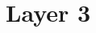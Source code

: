 \documentclass[a4paper]{article}
\theoremstyle{definition}
\newtheorem{definition}{Definition}[section]
\newtheorem{proposition}[definition]{Proposition}
\theoremstyle{remark}
\newcommand{\defn}{\emph}
\renewcommand{\phi}{\varphi}
\newcommand{\U}{\mathcal{U}}
\newcommand{\V}{\mathcal{V}}
\newcommand{\nm}{\mathsf}
\newcommand{\combinator}{\nm}
\newcommand{\constPi}{\combinator{Kd}}
\newcommand{\appPi}{\combinator{Ad}}
\newcommand{\compFunPi}{\combinator{Bd}}
\begin{document}
%
%
%

\section{Layer 3}



\end{document}
